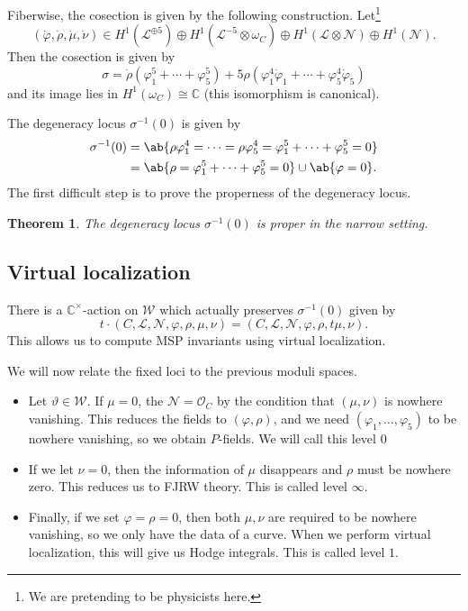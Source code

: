 \documentclass[10pt]{amsart}
\newtheorem{thm}{Theorem}[section]
\theoremstyle{definition}
\theoremstyle{remark}
\theoremstyle{plain}
\theoremstyle{definition}
\theoremstyle{remark}
\newcommand{\C}{\mathbb{C}}
\newcommand{\mc}[1]{\mathcal{#1}}
\newcommand{\1}{\mathbf{1}}
\newcommand{\2}{\mathbf{2}}
\newcommand{\3}{\mathbf{3}}
\begin{document}
Fiberwise, the cosection is given by the following construction. Let\footnote{We are pretending to be physicists here.}
\[ (\dot{\varphi}, \dot{\rho}, \dot{\mu}, \dot{\nu}) \in H^1(\mc{L}^{\oplus 5}) \oplus H^1(\mc{L}^{-5} \otimes \omega_C) \oplus H^1(\mc{L} \otimes \mc{N}) \oplus H^1(\mc{N}). \]
Then the cosection is given by
\[ \sigma = \dot{\rho}(\varphi_1^5 + \cdots + \varphi_5^5) + 5 \rho (\varphi_1^4 \dot{\varphi}_1 + \cdots + \varphi_5^4 \dot{\varphi}_5) \]
and its image lies in $H^1(\omega_C) \cong \C$ (this isomorphism is canonical).

The degeneracy locus $\sigma^{-1}(0)$ is given by
\begin{align*}
    \sigma^{-1}(0) &= \ab\{ \rho \varphi_1^4 = \cdots = \rho \varphi_5^4 = \varphi_1^5 + \cdots + \varphi_5^5 = 0\} \\
    &= \ab\{ \rho = \varphi_1^5 + \cdots + \varphi_5^5 = 0\} \cup \ab\{ \varphi = 0 \}.
\end{align*}
The first difficult step is to prove the properness of the degeneracy locus.

\begin{thm}
    The degeneracy locus $\sigma^{-1}(0)$ is proper in the narrow setting.
\end{thm}

\subsection{Virtual localization}%
\label{sub:Torus action}

There is a $\C^{\times}$-action on $\mc{W}$ which actually preserves $\sigma^{-1}(0)$ given by
\[ t \cdot (C, \mc{L},\mc{N},\varphi,\rho,\mu,\nu) = (C, \mc{L},\mc{N},\varphi, \rho,t\mu,\nu). \]
This allows us to compute MSP invariants using virtual localization.

We will now relate the fixed loci to the previous moduli spaces.

\begin{itemize}
    \item Let $\vartheta \in \mc{W}$. If $\mu = 0$, the $\mc{N} = \mc{O}_C$ by the condition that $(\mu,\nu)$ is nowhere vanishing. This reduces the fields to $(\varphi, \rho)$, and we need $(\varphi_1, \ldots, \varphi_5)$ to be nowhere vanishing, so we obtain $P$-fields. We will call this level $0$
    \item If we let $\nu = 0$, then the information of $\mu$ disappears and $\rho$ must be nowhere zero. This reduces us to FJRW theory. This is called level $\infty$.
    \item Finally, if we set $\varphi = \rho = 0$, then both $\mu, \nu$ are required to be nowhere vanishing, so we only have the data of a curve. When we perform virtual localization, this will give us Hodge integrals. This is called level $1$.
\end{itemize}
\end{document}
